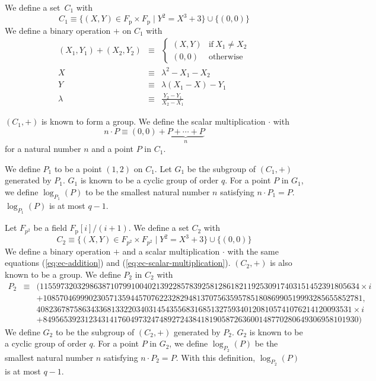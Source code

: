 \documentclass[9pt,oneside]{amsart}
\begin{document}
We define a set~$C_1$ with
\begin{equation}
C_1\equiv\{(X,Y)\in F_{\mathrm{p}}\times F_{\mathrm{p}}\mid Y^2=X^3+3\}\cup\{(0,0)\}
\end{equation}
We define a binary operation $+$ on $C_1$ with
\begin{eqnarray}\label{eq:ec-addition}
(X_1, Y_1) + (X_2, Y_2)&\equiv&\begin{cases}
(X,Y)&\text{if}\ X_1\neq X_2\\
(0,0)&\text{otherwise}
\end{cases}\\
X&\equiv&\lambda^2-X_1-X_2\\
Y&\equiv&\lambda(X_1-X)-Y_1\\
\lambda&\equiv&\frac{Y_2-Y_1}{X_2-X_1}
\end{eqnarray}

$(C_1,+)$ is known to form a group. We define the scalar multiplication $\cdot$ with
\begin{equation}\label{eq:ec-scalar-multiplication}
n\cdot P\equiv(0,0)+\underbrace{P+\cdots+P}_{n}
\end{equation}
for a natural number $n$ and a point $P$ in $C_1$.

We define $P_1$ to be a point $(1,2)$ on $C_1$. Let $G_1$ be the subgroup of $(C_1,+)$ generated by $P_1$. $G_1$ is known to be a cyclic group of order $q$. For a point $P$ in $G_1$, we define $\log_{P_1}(P)$ to be the smallest natural number $n$ satisfying $n\cdot P_1=P$. $\log_{P_1}(P)$ is at most $q-1$.

Let $F_{p^2}$ be a field $F_{\mathrm{p}}[i]/(i+1)$. We define a set $C_2$ with
\begin{equation}
C_2\equiv\{(X,Y)\in F_{p^2}\times F_{p^2}\mid Y^2=X^3+3\}\cup\{(0,0)\}
\end{equation}
We define a binary operation $+$ and a scalar multiplication $\cdot$ with the same equations (\ref{eq:ec-addition}) and (\ref{eq:ec-scalar-multiplication}). $(C_2,+)$ is also known to be a group. We define $P_2$ in $C_2$ with
\begin{eqnarray}
P_2&\equiv&
(11559732032986387107991004021392285783925812861821192530917403151452391805634 \times i\\\nonumber &&+ 10857046999023057135944570762232829481370756359578518086990519993285655852781,\\\nonumber && 4082367875863433681332203403145435568316851327593401208105741076214120093531 \times i\\\nonumber &&+ 8495653923123431417604973247489272438418190587263600148770280649306958101930)
\end{eqnarray}
We define $G_2$ to be the subgroup of $(C_2,+)$ generated by $P_2$. $G_2$ is known to be a cyclic group of order $q$. For a point $P$ in $G_2$, we define $\log_{P_2}(P)$ be the smallest natural number $n$ satisfying $n\cdot P_2=P$. With this definition, $\log_{P_2}(P)$ is at most $q-1$.
\end{document}
